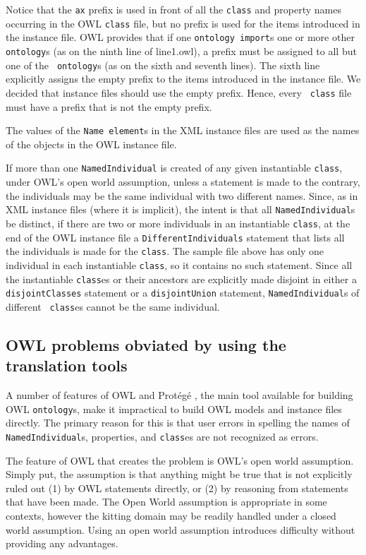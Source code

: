 \documentclass[preprint,12pt]{elsarticle}
\begin{document}
Notice that the {\tt ax} prefix is used in front of all the {\tt class} and
property names occurring in the OWL {\tt class} file, but no prefix is used
for the items introduced in the instance file. OWL provides that if one
{\tt ontology import}s one or more other {\tt ontology}s (as on the ninth
line of line1.owl), a prefix must be assigned to all but one of the {\tt
  ontology}s (as on the sixth and seventh lines). The sixth line explicitly
assigns the empty prefix to the items introduced in the instance file. We
decided that instance files should use the empty prefix. Hence, every {\tt
  class} file must have a prefix that is not the empty prefix.

The values of the {\tt Name element}s in the XML instance files are used as
the names of the objects in the OWL instance file.

If more than one {\tt NamedIndividual} is created of any given instantiable
{\tt class}, under OWL's open world assumption, unless a statement is made
to the contrary, the individuals may be the same individual with two
different names. Since, as in XML instance files (where it is implicit),
the intent is that all {\tt NamedIndividual}s be distinct, if there are two
or more individuals in an instantiable {\tt class}, at the end of the OWL
instance file a {\tt DifferentIndividuals} statement that lists all the
individuals is made for the {\tt class}. The sample file above has only one
individual in each instantiable {\tt class}, so it contains no such
statement. Since all the instantiable {\tt class}es or their ancestors are
explicitly made disjoint in either a {\tt disjointClasses} statement or a
{\tt disjointUnion} statement, {\tt NamedIndividual}s of different {\tt
  class}es cannot be the same individual.

\subsection{OWL problems obviated by using the translation tools}
\label{problemsGone}

A number of features of OWL \cite{owlPrimer,owlSpecification} and Prot\'eg\'e \cite{protege}, the main
tool available for building OWL {\tt ontology}s, make it impractical to
build OWL models and instance files directly. The primary reason for this
is that user errors in spelling the names of {\tt NamedIndividual}s,
properties, and {\tt class}es are not recognized as errors.

The feature of OWL that creates the problem is OWL's open world assumption.
Simply put, the assumption is that anything might be true that is not
explicitly ruled out (1) by OWL statements directly, or (2) by reasoning
from statements that have been made. The Open World assumption is
appropriate in some contexts, however the kitting domain may be readily
handled under a closed world assumption. Using an open world assumption
introduces difficulty without providing any advantages.
\end{document}
